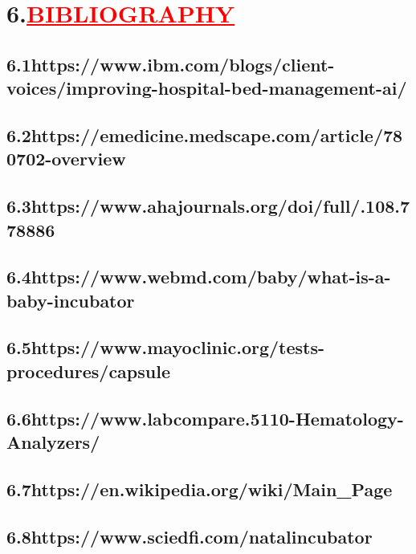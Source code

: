 \documentclass[12pt]{article}
\begin{document}
\section*{\textbf{6.\hspace{1cm}\textcolor{red}{\underline{\huge{BIBLIOGRAPHY}}}}}
\vspace{1cm}
\subsection*{\hspace{1cm}\textbf{6.1\hspace{1cm}\large{https://www.ibm.com/blogs/client-voices/improving-hospital-bed-management-ai/}}}
\subsection*{\hspace{1cm}\textbf{6.2\hspace{1cm}\large{https://emedicine.medscape.com/article/780702-overview}}}
\subsection*{\hspace{1cm}\textbf{6.3\hspace{1cm}\large{https://www.ahajournals.org/doi/full/.108.778886}}}
\subsection*{\hspace{1cm}\textbf{6.4\hspace{1cm}\large{https://www.webmd.com/baby/what-is-a-baby-incubator}}}
\subsection*{\hspace{1cm}\textbf{6.5\hspace{1cm}\large{https://www.mayoclinic.org/tests-procedures/capsule}}}
\subsection*{\hspace{1cm}\textbf{6.6\hspace{1cm}\large{https://www.labcompare.5110-Hematology-Analyzers/}}}
\subsection*{\hspace{1cm}\textbf{6.7\hspace{1cm}\large{https://en.wikipedia.org/wiki/Main_Page}}}
\subsection*{\hspace{1cm}\textbf{6.8\hspace{1cm}\large{https://www.sciedfi.com/natalincubator}}}
\end{document}
